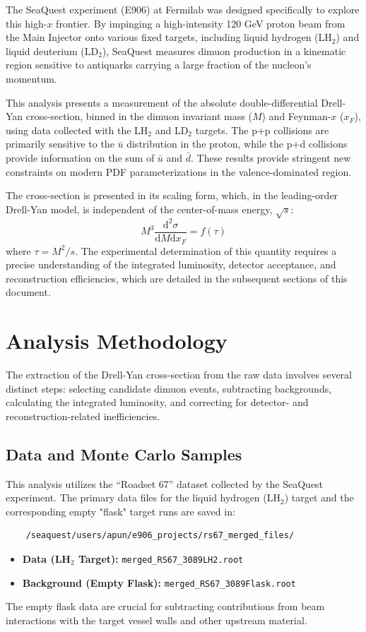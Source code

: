 \documentclass[11pt]{article}
\newcommand{\diffd}{\mathrm{d}}
\begin{document}
The SeaQuest experiment (E906) at Fermilab was designed specifically to explore this high-$x$ frontier. By impinging a high-intensity 120 GeV proton beam from the Main Injector onto various fixed targets, including liquid hydrogen (LH$_2$) and liquid deuterium (LD$_2$), SeaQuest measures dimuon production in a kinematic region sensitive to antiquarks carrying a large fraction of the nucleon's momentum.

This analysis presents a measurement of the absolute double-differential Drell-Yan cross-section, binned in the dimuon invariant mass ($M$) and Feynman-$x$ ($x_F$), using data collected with the LH$_2$ and LD$_2$ targets. The p+p collisions are primarily sensitive to the $\bar{u}$ distribution in the proton, while the p+d collisions provide information on the sum of $\bar{u}$ and $\bar{d}$. These results provide stringent new constraints on modern PDF parameterizations in the valence-dominated region.

The cross-section is presented in its scaling form, which, in the leading-order Drell-Yan model, is independent of the center-of-mass energy, $\sqrt{s}$:
\begin{equation}
    M^{3}\frac{\diffd^{2}\sigma}{\diffd M \diffd x_{F}} = f(\tau)
\end{equation}
where $\tau = M^2/s$. The experimental determination of this quantity requires a precise understanding of the integrated luminosity, detector acceptance, and reconstruction efficiencies, which are detailed in the subsequent sections of this document.

\section{Analysis Methodology}
\label{sec:methodology}
The extraction of the Drell-Yan cross-section from the raw data involves several distinct steps: selecting candidate dimuon events, subtracting backgrounds, calculating the integrated luminosity, and correcting for detector- and reconstruction-related inefficiencies.

\subsection{Data and Monte Carlo Samples}
This analysis utilizes the ``Roadset 67'' dataset collected by the SeaQuest experiment. The primary data files for the liquid hydrogen (LH$_2$) target and the corresponding empty "flask" target runs are saved in:
\begin{verbatim}
    /seaquest/users/apun/e906_projects/rs67_merged_files/
\end{verbatim}
\begin{itemize}
    \item \textbf{Data (LH$_2$ Target):} \texttt{merged\_RS67\_3089LH2.root}
    \item \textbf{Background (Empty Flask):} \texttt{merged\_RS67\_3089Flask.root}
\end{itemize}
The empty flask data are crucial for subtracting contributions from beam interactions with the target vessel walls and other upstream material.
\end{document}
